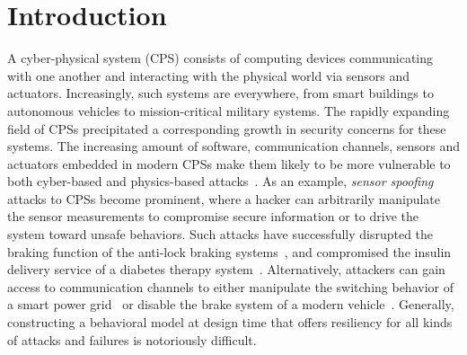\section{Introduction}
\label{sec:intro}
%
%
%
A cyber-physical system (CPS) consists of computing devices communicating with one another and interacting with the physical world via sensors and actuators. Increasingly, such systems are everywhere, from smart buildings to autonomous vehicles to mission-critical military systems. 
%
The rapidly expanding field of CPSs precipitated a corresponding growth in security concerns for these systems. The increasing amount of software, communication channels, sensors and actuators embedded in modern CPSs make them likely to be more vulnerable to both cyber-based and physics-based attacks~\cite{wan2015security, wasicek2014aspect, kocher2004security, al2015design, gamage2010enforcing}. As an example, \emph{sensor spoofing} attacks to CPSs become prominent, where a hacker can arbitrarily manipulate the sensor measurements to compromise secure information or to drive the system toward unsafe behaviors. Such attacks have successfully disrupted the braking function of the anti-lock braking systems~\cite{Shoukry2013,al2015design}, and compromised the insulin delivery service of a diabetes therapy system~\cite{li2011hijacking}. Alternatively, attackers can gain access to communication channels to either manipulate the switching behavior of a smart power grid~\cite{liu2011class} or disable the brake system of a modern vehicle~\cite{koscher2010experimental}. Generally, constructing a behavioral model at design time that offers resiliency for all kinds of attacks and failures is notoriously difficult. 
%

